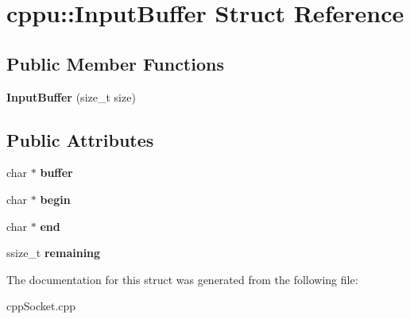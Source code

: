 \hypertarget{structcppu_1_1InputBuffer}{}\section{cppu\+:\+:Input\+Buffer Struct Reference}
\label{structcppu_1_1InputBuffer}
\subsection*{Public Member Functions}
\begin{DoxyCompactItemize}
\item 
\hypertarget{structcppu_1_1InputBuffer_ac50e17e3cfb76a2983e5e3d4558b8144}{}{\bfseries Input\+Buffer} (size\+\_\+t size)\label{structcppu_1_1InputBuffer_ac50e17e3cfb76a2983e5e3d4558b8144}

\end{DoxyCompactItemize}
\subsection*{Public Attributes}
\begin{DoxyCompactItemize}
\item 
\hypertarget{structcppu_1_1InputBuffer_a85138068e2e10731e46784b1552bc354}{}char $\ast$ {\bfseries buffer}\label{structcppu_1_1InputBuffer_a85138068e2e10731e46784b1552bc354}

\item 
\hypertarget{structcppu_1_1InputBuffer_adbd6fb30fe51a192c9bbba6333016f31}{}char $\ast$ {\bfseries begin}\label{structcppu_1_1InputBuffer_adbd6fb30fe51a192c9bbba6333016f31}

\item 
\hypertarget{structcppu_1_1InputBuffer_ac9fb4f51a6db191e71976fcda20237c0}{}char $\ast$ {\bfseries end}\label{structcppu_1_1InputBuffer_ac9fb4f51a6db191e71976fcda20237c0}

\item 
\hypertarget{structcppu_1_1InputBuffer_a646b547733665524fa8b5de6b093ab11}{}ssize\+\_\+t {\bfseries remaining}\label{structcppu_1_1InputBuffer_a646b547733665524fa8b5de6b093ab11}

\end{DoxyCompactItemize}


The documentation for this struct was generated from the following file\+:\begin{DoxyCompactItemize}
\item 
cpp\+Socket.\+cpp\end{DoxyCompactItemize}
